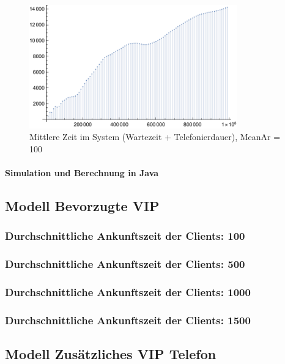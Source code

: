 \begin{figure}[htpb]
	\centering
	\includegraphics[width=0.8\textwidth]{abbildungen/auswertung100/meanSystemTimePlot.pdf}
	\caption{Mittlere Zeit im System (Wartezeit + Telefonierdauer), MeanAr = 100}
	\label{fig:meanSystemTime100}
\end{figure}
  
\paragraph{Simulation und Berechnung in Java}




\subsection{Modell \glqq Bevorzugte VIP\grqq} 
\subsubsection{Durchschnittliche Ankunftszeit der Clients: 100}
\subsubsection{Durchschnittliche Ankunftszeit der Clients: 500}
\subsubsection{Durchschnittliche Ankunftszeit der Clients: 1000}
\subsubsection{Durchschnittliche Ankunftszeit der Clients: 1500}

\subsection{Modell \glqq Zusätzliches VIP Telefon\grqq} 
